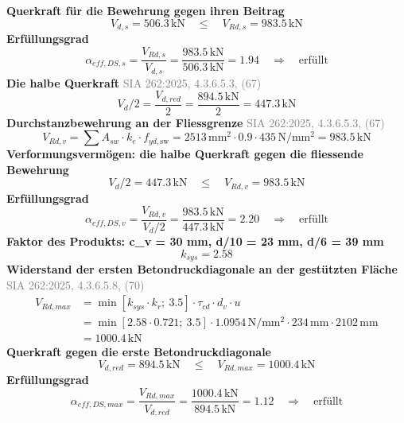 \documentclass[11pt,a4paper]{article}
\newcommand{\normref}[1]{{\small\textcolor{gray}{#1}}}
\begin{document}
\noindent\textbf{Querkraft für die Bewehrung gegen ihren Beitrag}
\begin{equation*}
V_{d,s} = 506.3\,\mathrm{kN} \quad \le \quad V_{Rd,s} = 983.5\,\mathrm{kN}
\end{equation*}
\noindent\textbf{Erfüllungsgrad}
\begin{equation*}
\alpha_{eff,DS,s} = \frac{V_{Rd,s}}{V_{d,s}} = \frac{983.5\,\mathrm{kN}}{506.3\,\mathrm{kN}} = 1.94 \quad \Rightarrow \quad \text{erfüllt}
\end{equation*}
\noindent\textbf{Die halbe Querkraft} \hfill \normref{SIA 262:2025, 4.3.6.5.3, (67)}
\begin{equation*}
V_d / 2 = \frac{V_{d,red}}{2} = \frac{894.5\,\mathrm{kN}}{2} = 447.3\,\mathrm{kN}
\end{equation*}
\noindent\textbf{Durchstanzbewehrung an der Fliessgrenze} \hfill \normref{SIA 262:2025, 4.3.6.5.3, (67)}
\begin{equation*}
V_{Rd,v} = \sum A_{sw} \cdot k_e \cdot f_{yd,\text{sw}} = 2513\,\mathrm{mm}^{2} \cdot 0.9 \cdot 435\,\mathrm{N}/\mathrm{mm}^{2} = 983.5\,\mathrm{kN}
\end{equation*}
\noindent\textbf{Verformungsvermögen: die halbe Querkraft gegen die fliessende Bewehrung}
\begin{equation*}
V_d / 2 = 447.3\,\mathrm{kN} \quad \le \quad V_{Rd,v} = 983.5\,\mathrm{kN}
\end{equation*}
\noindent\textbf{Erfüllungsgrad}
\begin{equation*}
\alpha_{eff,DS,v} = \frac{V_{Rd,v}}{V_d / 2} = \frac{983.5\,\mathrm{kN}}{447.3\,\mathrm{kN}} = 2.20 \quad \Rightarrow \quad \text{erfüllt}
\end{equation*}
\noindent\textbf{Faktor des Produkts: c\_v = 30 mm, d/10 = 23 mm, d/6 = 39 mm}
\begin{equation*}
k_{sys} = 2.58
\end{equation*}
\noindent\textbf{Widerstand der ersten Betondruckdiagonale an der gestützten Fläche} \hfill \normref{SIA 262:2025, 4.3.6.5.8, (70)}
\begin{equation*}
\begin{aligned}
  V_{Rd,max} &= \min\left[k_{sys} \cdot k_r;\ 3.5\right] \cdot \tau_{cd} \cdot d_v \cdot u \\
  &= \min\left[2.58 \cdot 0.721;\ 3.5\right] \cdot 1.0954\,\mathrm{N}/\mathrm{mm}^{2} \cdot 234\,\mathrm{mm} \cdot 2102\,\mathrm{mm} \\
  &= 1000.4\,\mathrm{kN}
\end{aligned}
\end{equation*}
\noindent\textbf{Querkraft gegen die erste Betondruckdiagonale}
\begin{equation*}
V_{d,red} = 894.5\,\mathrm{kN} \quad \le \quad V_{Rd,max} = 1000.4\,\mathrm{kN}
\end{equation*}
\noindent\textbf{Erfüllungsgrad}
\begin{equation*}
\alpha_{eff,DS,max} = \frac{V_{Rd,max}}{V_{d,red}} = \frac{1000.4\,\mathrm{kN}}{894.5\,\mathrm{kN}} = 1.12 \quad \Rightarrow \quad \text{erfüllt}
\end{equation*}
\end{document}
